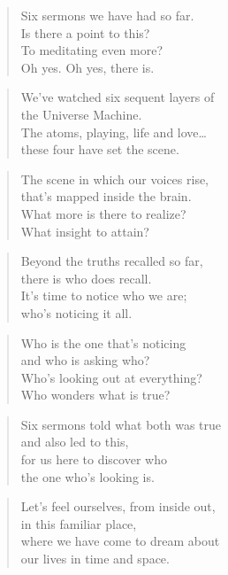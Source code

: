 \documentclass[10pt,a4paper]{article}
\begin{document}
\begin{paracol}{2}


\begin{verse}
Six sermons we have had so far.\\
Is there a point to this?\\
To meditating even more?\\
Oh yes. Oh yes, there is.
\end{verse}

\begin{verse}
We’ve watched six sequent layers of\\
the Universe Machine.\\
The atoms, playing, life and love…\\
these four have set the scene.
\end{verse}

\begin{verse}
The scene in which our voices rise,\\
that’s mapped inside the brain.\\
What more is there to realize?\\
What insight to attain?
\end{verse}

\begin{verse}
Beyond the truths recalled so far,\\
there is who does recall.\\
It’s time to notice who we are;\\
who’s noticing it all.
\end{verse}

\begin{verse}
Who is the one that’s noticing\\
and who is asking who?\\
Who’s looking out at everything?\\
Who wonders what is true?
\end{verse}

\begin{verse}
Six sermons told what both was true\\
and also led to this,\\
for us here to discover who\\
the one who’s looking is.
\end{verse}

\begin{verse}
Let’s feel ourselves, from inside out,\\
in this familiar place,\\
where we have come to dream about\\
our lives in time and space.
\end{verse}


\end{paracol}
\end{document}
